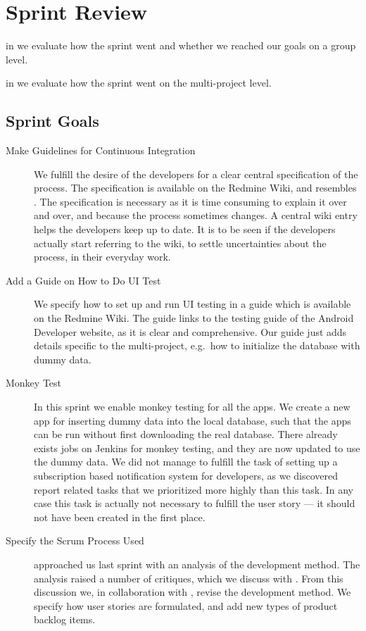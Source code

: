 \chapter{Sprint Review}\label{chap:sprint3_end}

\begin{chapterorganization}
  \item in  we evaluate how the sprint went and whether we reached our goals on a group level.
  \item in  we evaluate how the sprint went on the multi-project level.
\end{chapterorganization}

\section{Sprint Goals}\label{sec:s3_goals}
\begin{description}
  \item[Make Guidelines for Continuous Integration] We fulfill the desire of the developers for a clear central specification of the process. The specification is available on the Redmine Wiki, and resembles . The specification is necessary as it is time consuming to explain it over and over, and because the process sometimes changes. A central wiki entry helps the developers keep up to date. It is to be seen if the developers actually start referring to the wiki, to settle uncertainties about the process, in their everyday work. 
  \item[Add a Guide on How to Do UI Test] We specify how to set up and run UI testing in a guide which is available on the Redmine Wiki. The guide links to the testing guide \parencite{AndroidUnit} of the Android Developer website, as it is clear and comprehensive. Our guide just adds details specific to the multi-project, e.g.\ how to initialize the database with dummy data.  
  \item[Monkey Test] In this sprint we enable monkey testing for all the apps. We create a new app for inserting dummy data into the local database, such that the apps can be run without first downloading the real database. There already exists jobs on Jenkins for monkey testing, and they are now updated to use the dummy data. We did not manage to fulfill the task of setting up a subscription based notification system for developers, as we discovered report related tasks that we prioritized more highly than this task. In any case this task is actually not necessary to fulfill the user story --- it should not have been created in the first place.
  \item[Specify the Scrum Process Used]  approached us last sprint with an analysis of the development method. The analysis raised a number of critiques, which we discuss with . From this discussion we, in collaboration with , revise the development method. We specify how user stories are formulated, and add new types of product backlog items.
\end{description}

